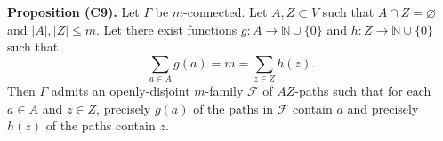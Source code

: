 \textbf{Proposition (C9).} Let $\Gamma$ be $m$-connected. Let $A, Z \subset V$ such that $A \cap Z = \varnothing$ and $|A|, |Z| \leq m$. Let there exist functions $g: A \to \mathbb{N} \cup \{0\}$ and $h: Z \to \mathbb{N} \cup \{0\}$ such that
$$\sum_{a \in A} g(a) = m = \sum_{z \in Z} h(z).$$
Then $\Gamma$ admits an openly-disjoint $m$-family $\mathcal{F}$ of $AZ$-paths such that for each $a \in A$ and $z \in Z$, precisely $g(a)$ of the paths in $\mathcal{F}$ contain $a$ and precisely $h(z)$ of the paths contain $z$.
